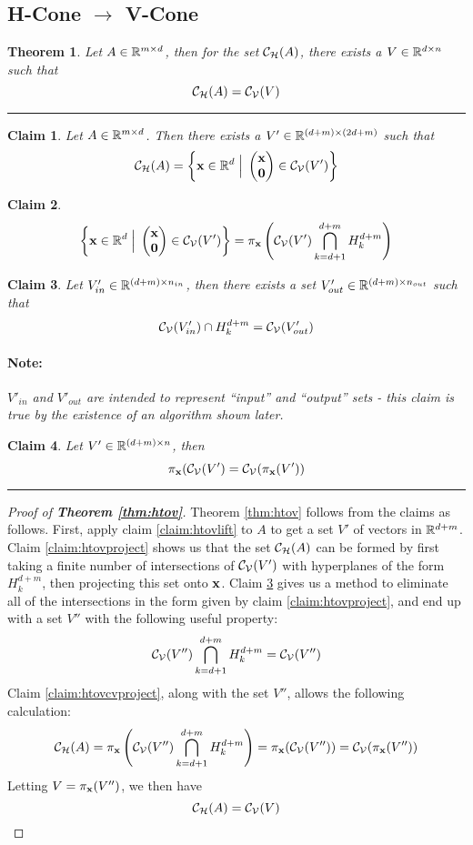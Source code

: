 \documentclass[a4,fleqn]{article}
\newtheorem{thm}{Theorem}
\newtheorem{claim}{Claim}
\begin{document}
\subsection {H-Cone $\to$ V-Cone}

\begin{thm}{\label{thm:htov}
  Let $A \in \mathbb{R}^{m \times d}$, then for the set $\mathcal{C}_{\mathcal{H}}(A)$, there exists a ${V \in \mathbb{R}^{d \times n}}$ such that 
  \[\mathcal{C}_{\mathcal{H}}(A) = \mathcal{C}_{\mathcal{V}}(V)\]
} \end{thm}
\hrule
\begin{claim}{\label{claim:htovlift}
  Let $A \in \mathbb{R}^{m \times d}$.  Then there exists a $V' \in \mathbb{R}^{(d+m) \times (2d+m)}$ such that 
  \[\CH(A) =  \left\{ \x \in \R^d \Suchthat 
              \svec{\x}{\vec{0}} \in \CV(V') \right\}
  \]
} \end{claim}

\begin{claim}{\label{claim:htovproject}
  \[  \left\{ \x \in \R^d \Suchthat 
              \svec{\x}{\vec{0}} \in \CV(V') \right\}
           = \pi_{\x} \left(\CV(V') \bigcap_{k=d+1}^{d+m} H_k^{d+m}\right)\]
} \end{claim}

\begin{claim}{\label{claim:htovdrop}
  Let $V'_{in} \in \mathbb{R}^{(d+m) \times n_{in}}$, then there exists a set $V'_{out} \in \mathbb{R}^{(d+m) \times n_{out}}$ such that
 \[ \mathcal{C}_{\mathcal{V}}(V'_{in}) \cap H_{k}^{d+m} = \mathcal{C}_{\mathcal{V}}(V'_{out}) \]
\paragraph{Note:} $V'_{in}$ and $V'_{out}$ are intended to represent ``input'' and ``output'' sets - this claim is true by the existence of an algorithm shown later.
} \end{claim}

\begin{claim}{\label{claim:htovcvproject}
  Let $V' \in \mathbb{R}^{(d+m) \times n}$, then 
 \[ \pi_{\mathbf{x}}(\mathcal{C}_{\mathcal{V}}(V') = \mathcal{C}_{\mathcal{V}}(\pi_{\mathbf{x}}(V')) \]
} \end{claim}

\bigskip \hrule

\begin{proof}[Proof of \textnormal{\textbf{Theorem \ref{thm:htov}}}]
Theorem \ref{thm:htov} follows from the claims as follows.  First, apply claim \ref{claim:htovlift} to $A$ to get a set $V'$ of vectors in $\mathbb{R}^{d+m}$.  Claim \ref{claim:htovproject} shows us that the set $\mathcal{C}_{\mathcal{H}}(A)$ can be formed by first taking a finite number of intersections of $\mathcal{C}_{\mathcal{V}}(V')$ with hyperplanes of the form $H_k^{d+m}$, then projecting this set onto $\mathbf{x}$.  Claim \ref{claim:htovdrop} gives us a method to eliminate all of the intersections in the form given by claim \ref{claim:htovproject}, and end up with a set $V''$ with the following useful property:
\[  \mathcal{C}_{\mathcal{V}}(V'') \bigcap_{k=d+1}^{d+m} H_k^{d+m} = \mathcal{C}_{\mathcal{V}}(V'') \]
Claim \ref{claim:htovcvproject}, along with the set $V''$, allows the following calculation:
\[ \mathcal{C}_{\mathcal{H}}(A) = \pi_{\mathbf{x}} \left(\mathcal{C}_{\mathcal{V}}(V'') \bigcap_{k=d+1}^{d+m} H_k^{d+m}\right)
          = \pi_{\mathbf{x}} (\mathcal{C}_{\mathcal{V}}(V'')) = \mathcal{C}_{\mathcal{V}}(\pi_{\mathbf{x}}(V''))
\]
Letting $V = \pi_{\mathbf{x}}(V'')$, we then have 
\[ \mathcal{C}_{\mathcal{H}}(A) = \mathcal{C}_{\mathcal{V}}(V) \]
\end{proof}
\end{document}
